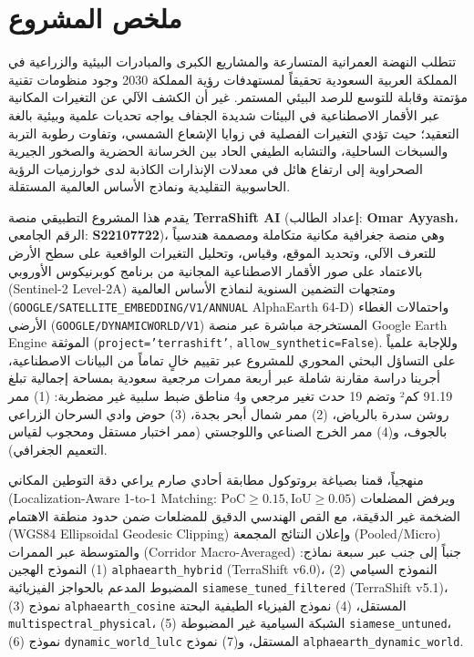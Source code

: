 \chapter*{ملخص المشروع}

تتطلب النهضة العمرانية المتسارعة والمشاريع الكبرى والمبادرات البيئية والزراعية في المملكة العربية السعودية تحقيقاً لمستهدفات رؤية المملكة 2030 وجود منظومات تقنية مؤتمتة وقابلة للتوسع للرصد البيئي المستمر. غير أن الكشف الآلي عن التغيرات المكانية عبر الأقمار الاصطناعية في البيئات شديدة الجفاف يواجه تحديات علمية وبيئية بالغة التعقيد؛ حيث تؤدي التغيرات الفصلية في زوايا الإشعاع الشمسي، وتفاوت رطوبة التربة والسبخات الساحلية، والتشابه الطيفي الحاد بين الخرسانة الحضرية والصخور الجيرية الصحراوية إلى ارتفاع هائل في معدلات الإنذارات الكاذبة لدى خوارزميات الرؤية الحاسوبية التقليدية ونماذج الأساس العالمية المستقلة.

يقدم هذا المشروع التطبيقي منصة \textbf{TerraShift AI} (إعداد الطالب: \textbf{Omar Ayyash}، الرقم الجامعي: \textbf{S22107722})، وهي منصة جغرافية مكانية متكاملة ومصممة هندسياً للتعرف الآلي، وتحديد الموقع، وقياس، وتحليل التغيرات الواقعية على سطح الأرض بالاعتماد على صور الأقمار الاصطناعية المجانية من برنامج كوبرنيكوس الأوروبي (Sentinel-2 Level-2A) ومتجهات التضمين السنوية لنماذج الأساس العالمية (\texttt{GOOGLE/SATELLITE\_EMBEDDING/V1/ANNUAL} AlphaEarth 64-D) واحتمالات الغطاء الأرضي (\texttt{GOOGLE/DYNAMICWORLD/V1}) المستخرجة مباشرة عبر منصة Google Earth Engine الموثقة (\texttt{project='terrashift'}, \texttt{allow\_synthetic=False}). وللإجابة علمياً على التساؤل البحثي المحوري للمشروع عبر تقييم خالٍ تماماً من البيانات الاصطناعية، أجرينا دراسة مقارنة شاملة عبر أربعة ممرات مرجعية سعودية بمساحة إجمالية تبلغ 91.19 كم² وتضم 19 حدث تغير مرجعي و4 مناطق ضبط سلبية غير مضطربة: (1) ممر روشن سدرة بالرياض، (2) ممر شمال أبحر بجدة، (3) حوض وادي السرحان الزراعي بالجوف، و(4) ممر الخرج الصناعي واللوجستي (ممر اختبار مستقل ومحجوب لقياس التعميم الجغرافي).

منهجياً، قمنا بصياغة بروتوكول مطابقة أحادي صارم يراعي دقة التوطين المكاني (Localization-Aware 1-to-1 Matching: $\text{PoC} \ge 0.15, \text{IoU} \ge 0.05$) ويرفض المضلعات الضخمة غير الدقيقة، مع القص الهندسي الدقيق للمضلعات ضمن حدود منطقة الاهتمام (WGS84 Ellipsoidal Geodesic Clipping) وإعلان النتائج المجمعة (Pooled/Micro) والمتوسطة عبر الممرات (Corridor Macro-Averaged) جنباً إلى جنب عبر سبعة نماذج: (1) النموذج الهجين \texttt{alphaearth\_hybrid} (TerraShift v6.0)، (2) النموذج السيامي المضبوط المدعم بالحواجز الفيزيائية \texttt{siamese\_tuned\_filtered} (TerraShift v5.1)، (3) نموذج \texttt{alphaearth\_cosine} المستقل، (4) نموذج الفيزياء الطيفية البحتة \texttt{multispectral\_physical}، (5) الشبكة السيامية غير المضبوطة \texttt{siamese\_untuned}، (6) نموذج \texttt{dynamic\_world\_lulc} المستقل، و(7) نموذج \texttt{alphaearth\_dynamic\_world}.

